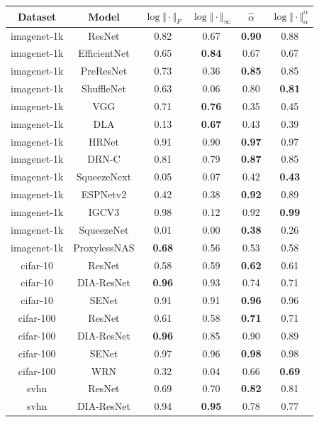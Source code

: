 \begin{table}[t]
\begin{center}
\begin{tabular}{|c|c|c|c|c|c|}
\hline
Dataset & Model  & $\log\Vert\cdot\Vert_{F}$ & $\log\Vert\cdot\Vert_{\infty}$ & $\hat{\alpha}$ & $\log\Vert\cdot\Vert^{\alpha}_{\alpha}$ \\
\hline
imagenet-1k & ResNet  & 0.82 &  0.67 & \textbf{0.90} & 0.88 \\
 imagenet-1k & EfficientNet  & 0.65 &  \textbf{0.84} & 0.67 & 0.67 \\
 imagenet-1k & PreResNet  & 0.73 &  0.36 & \textbf{0.85} & 0.85 \\
 imagenet-1k & ShuffleNet  & 0.63 &  0.06 & 0.80 & \textbf{0.81} \\
 imagenet-1k & VGG  & 0.71 &  \textbf{0.76} & 0.35 & 0.45 \\
 imagenet-1k & DLA  & 0.13 &  \textbf{0.67} & 0.43 & 0.39 \\
 imagenet-1k & HRNet  & 0.91 &  0.90 & \textbf{0.97} & 0.97 \\
 imagenet-1k & DRN-C  & 0.81 &  0.79 & \textbf{0.87} & 0.85 \\
 imagenet-1k & SqueezeNext  & 0.05 &  0.07 & 0.42 & \textbf{0.43} \\
 imagenet-1k & ESPNetv2  & 0.42 &  0.38 & \textbf{0.92} & 0.89 \\
 imagenet-1k & IGCV3  & 0.98 &  0.12 & 0.92 & \textbf{0.99} \\
 imagenet-1k & SqueezeNet  & 0.01 &  0.00 & \textbf{0.38} & 0.26 \\
 imagenet-1k & ProxylessNAS  & \textbf{0.68} &  0.56 & 0.53 & 0.58 \\
\hline
 cifar-10 & ResNet  & 0.58 &  0.59 & \textbf{0.62} & 0.61 \\
 cifar-10 & DIA-ResNet  & \textbf{0.96} &  0.93 & 0.74 & 0.71 \\
 cifar-10 & SENet  & 0.91 &  0.91 & \textbf{0.96} & 0.96 \\
\hline
 cifar-100 & ResNet  & 0.61 &  0.58 & \textbf{0.71} & 0.71 \\
 cifar-100 & DIA-ResNet  & \textbf{0.96} &  0.85 & 0.90 & 0.89 \\
 cifar-100 & SENet  & 0.97 &  0.96 & \textbf{0.98} & 0.98 \\
 cifar-100 & WRN  & 0.32 &  0.04 & 0.66 & \textbf{0.69} \\
\hline
 svhn & ResNet  & 0.69 &  0.70 & \textbf{0.82} & 0.81 \\
 svhn & DIA-ResNet  & 0.94 &  \textbf{0.95} & 0.78 & 0.77 \\

\end{tabular}
\end{center}
\end{table}
